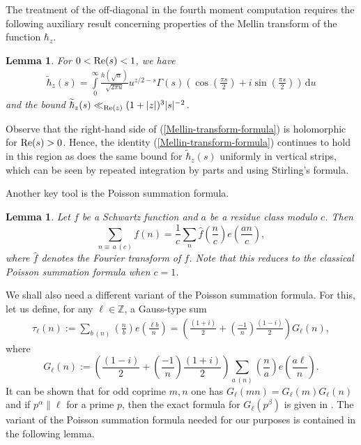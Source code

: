 \documentclass[a4paper,10pt,twoside]{amsart}
\newtheorem{lemma}[theorem]{Lemma}
\theoremstyle{definition}
\numberwithin{equation}{section}
\renewcommand{\Re}{\textnormal{Re}}
\renewcommand\:{\colon}
\begin{document}
The treatment of the off-diagonal in the fourth moment computation requires the following auxiliary result \cite[Lemma 3.3.]{Khan2010} concerning properties of the Mellin transform of the function $\hbar_z$.
\begin{lemma}\label{Mellin-transform-lemma}
For $0<\Re(s)<1$, we have
\begin{align}\label{Mellin-transform-formula}\widetilde\hbar_z(s)=\int\limits_0^\infty\frac{h(\sqrt u)}{\sqrt{2\pi u}}u^{z/2-s}\Gamma(s)\left(\cos\left(\frac{\pi s}2\right)+i\sin\left(\frac{\pi s}2\right)\right)\,\mathrm d u
\end{align}
and the bound $\widetilde\hbar_z(s)\ll_{\Re(z)}(1+|z|)^3|s|^{-2}$.
\end{lemma}
\noindent Observe that the right-hand side of (\ref{Mellin-transform-formula}) is holomorphic for $\Re(s)>0$. Hence, the identity (\ref{Mellin-transform-formula}) continues to hold in this region as does the same bound for $\widetilde\hbar_z(s)$ uniformly in vertical strips, which can be seen by repeated integration by parts and using Stirling's formula. 

Another key tool is the Poisson summation formula.

\begin{lemma}
Let $f$ be a Schwartz function and $a$ be a residue class modulo $c$. Then
\[\sum_{n\equiv\,a\,(c)}f(n)=\frac1c\sum_n\widehat f\left(\frac nc\right)e\left(\frac{an}c\right),\]
where $\widehat f$ denotes the Fourier transform of $f$. Note that this reduces to the classical Poisson summation formula when $c=1$. 
\end{lemma}

\noindent We shall also need a different variant of the Poisson summation formula. For this, let us define, for any $\ell\in\mathbb Z$, a Gauss-type sum
\begin{align}\label{Gauss-sum} 
\tau_\ell(n):=\sum_{b\,(n)}\left(\frac nb\right)e\left(\frac{\ell b}n\right)=\left(\frac{(1+i)}2+\left(\frac {-1}n\right)\frac{(1-i)}2\right)G_\ell(n),
\end{align}
where
\[ G_\ell(n):=\left(\frac{(1-i)}2+\left(\frac {-1}n\right)\frac{(1+i)}2\right)\sum_{a\,(n)}\left(\frac na\right)e\left(\frac{a\ell}n\right).\]
It can be shown that for odd coprime $m,n$ one has $G_\ell(mn)=G_\ell(m)G_\ell(n)$ and if $p^\alpha\|\ell$ for a prime $p$, then the exact formula for $G_\ell\left(p^\beta\right)$ is given in \cite[Lemma 2.3]{Soundararajan2000}. The variant of the Poisson summation formula needed for our purposes is contained in the following lemma.
\end{document}
